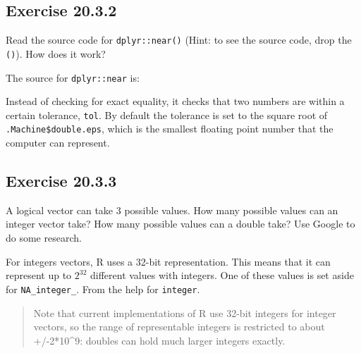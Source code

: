 \documentclass[]{book}
\newenvironment{Shaded}{\begin{snugshade}}{\end{snugshade}}
\newcommand{\CommentTok}[1]{\textcolor[rgb]{0.56,0.35,0.01}{\textit{#1}}}
\newcommand{\NormalTok}[1]{#1}
\newcommand{\OperatorTok}[1]{\textcolor[rgb]{0.81,0.36,0.00}{\textbf{#1}}}
\theoremstyle{plain}
\theoremstyle{remark}
\begin{document}
\hypertarget{exercise-20.3.2}{%
\subsection*{\texorpdfstring{Exercise
{20.3.2}}{Exercise 20.3.2}}\label{exercise-20.3.2}}

Read the source code for \texttt{dplyr::near()} (Hint: to see the source
code, drop the \texttt{()}). How does it work?

The source for \texttt{dplyr::near} is:

\begin{Shaded}
\end{Shaded}

Instead of checking for exact equality, it checks that two numbers are
within a certain tolerance, \texttt{tol}. By default the tolerance is
set to the square root of \texttt{.Machine\$double.eps}, which is the
smallest floating point number that the computer can represent.

\hypertarget{exercise-20.3.3}{%
\subsection*{\texorpdfstring{Exercise
{20.3.3}}{Exercise 20.3.3}}\label{exercise-20.3.3}}

A logical vector can take 3 possible values. How many possible values
can an integer vector take? How many possible values can a double take?
Use Google to do some research.

For integers vectors, R uses a 32-bit representation. This means that it
can represent up to \(2^{32}\) different values with integers. One of
these values is set aside for \texttt{NA\_integer\_}. From the help for
\texttt{integer}.

\begin{quote}
Note that current implementations of R use 32-bit integers for integer
vectors, so the range of representable integers is restricted to about
+/-2*10\^{}9: doubles can hold much larger integers exactly.
\end{quote}
\end{document}
